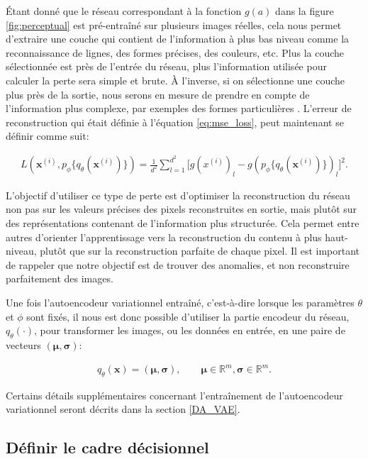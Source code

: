 Étant donné que le réseau correspondant à la fonction $g(a)$ dans la figure \ref{fig:perceptual} est pré-entraîné sur plusieurs images réelles, cela nous permet d'extraire une couche qui contient de l'information à plus bas niveau comme la reconnaissance de lignes, des formes précises, des couleurs, etc. Plus la couche sélectionnée est près de l'entrée du réseau, plus l'information utilisée pour calculer la perte sera simple et brute. À l'inverse, si on sélectionne une couche plus près de la sortie, nous serons en mesure de prendre en compte de l'information plus complexe, par exemples des formes particulières \citep{Johnson2016Perceptual}. L'erreur de reconstruction qui était définie à l'équation \ref{eq:mse_loss}, peut maintenant se définir comme suit:

\begin{gather} \label{eq:perceptual_loss}
L(\boldsymbol{x}^{(i)}, p_\phi\{q_\theta(\boldsymbol{x}^{(i)})\}) = \frac{1}{d^2} \sum_{l=1}^{d^2} \Big[g(x^{(i)})_{l} - g(p_\phi\{q_\theta(\boldsymbol{x}^{(i)})\})_{l}\Big]^2.
\end{gather}

L'objectif d'utiliser ce type de perte est d'optimiser la reconstruction du réseau non pas sur les valeurs précises des pixels reconstruites en sortie, mais plutôt sur des représentations contenant de l'information plus structurée. Cela permet entre autres d'orienter l'apprentissage vers la reconstruction du contenu à plus haut-niveau, plutôt que sur la reconstruction parfaite de chaque pixel. Il est important de rappeler que notre objectif est de trouver des anomalies, et non reconstruire parfaitement des images.

Une fois l'autoencodeur variationnel entraîné, c'est-à-dire lorsque les paramètres $\theta$ et $\phi$ sont fixés, il nous est donc possible d'utiliser la partie encodeur du réseau, $q_{\theta}(\cdot) $, pour transformer les images, ou les données en entrée, en une paire de vecteurs $(\boldsymbol{\mu}, \boldsymbol{\sigma})$:

\begin{gather}  \label{eq:encodeur}
q_{\theta}(\boldsymbol{x}) = (\boldsymbol{\mu}, \boldsymbol{\sigma}), \qquad \boldsymbol{\mu} \in \mathbb{R}^m, \boldsymbol{\sigma} \in \mathbb{R}^m.
\end{gather}

Certains détails supplémentaires concernant l'entraînement de l'autoencodeur variationnel seront décrits dans la section \ref{DA_VAE}.


\subsection{Définir le cadre décisionnel} \label{cadre_decisionnel}

